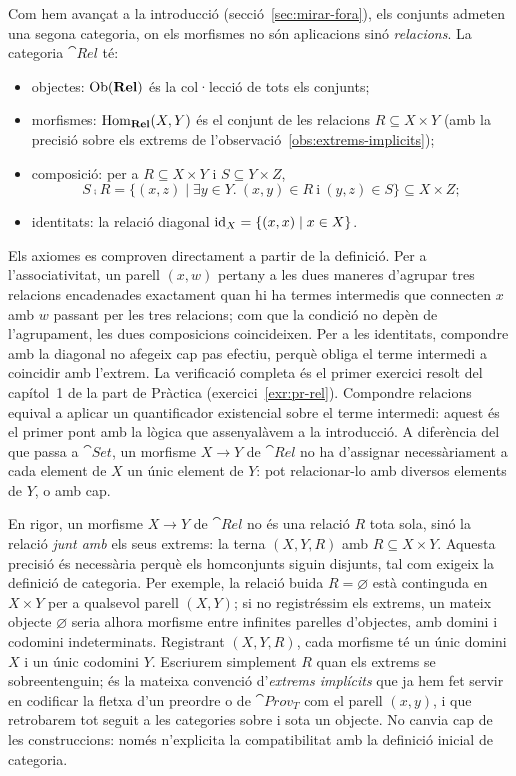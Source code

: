 Com hem avançat a la introducció (secció~\ref{sec:mirar-fora}), els conjunts admeten una segona categoria, on els morfismes no són aplicacions sinó \emph{relacions}. La categoria $\cat{Rel}$ té:
\begin{itemize}
\item objectes: $\operatorname{Ob}(\mathbf{Rel})$ és la col·lecció de tots els conjunts;
\item morfismes: $\operatorname{Hom}_{\mathbf{Rel}}(X,Y)$ és el conjunt de les relacions $R\subseteq X\times Y$ (amb la precisió sobre els extrems de l'observació~\ref{obs:extrems-implicits});
\item composició: per a $R\subseteq X\times Y$ i $S\subseteq Y\times Z$,
\[
S\comp R=\{(x,z)\mid \exists y\in Y.\ (x,y)\in R \ \text{i}\ (y,z)\in S\}\subseteq X\times Z;
\]
\item identitats: la relació diagonal $\operatorname{id}_X=\{(x,x)\mid x\in X\}$.
\end{itemize}
Els axiomes es comproven directament a partir de la definició. Per a l'associativitat, un parell $(x,w)$ pertany a les dues maneres d'agrupar tres relacions encadenades exactament quan hi ha termes intermedis que connecten $x$ amb $w$ passant per les tres relacions; com que la condició no depèn de l'agrupament, les dues composicions coincideixen. Per a les identitats, compondre amb la diagonal no afegeix cap pas efectiu, perquè obliga el terme intermedi a coincidir amb l'extrem. La verificació completa és el primer exercici resolt del capítol~1 de la part de Pràctica (exercici~\ref{exr:pr-rel}). Compondre relacions equival a aplicar un quantificador existencial sobre el terme intermedi: aquest és el primer pont amb la lògica que assenyalàvem a la introducció. A diferència del que passa a $\cat{Set}$, un morfisme $X\to Y$ de $\cat{Rel}$ no ha d'assignar necessàriament a cada element de $X$ un únic element de $Y$: pot relacionar-lo amb diversos elements de $Y$, o amb cap.

\begin{observacio}\label{obs:extrems-implicits}
En rigor, un morfisme $X\to Y$ de $\cat{Rel}$ no és una relació $R$ tota sola, sinó la relació \emph{junt amb} els seus extrems: la terna $(X,Y,R)$ amb $R\subseteq X\times Y$. Aquesta precisió és necessària perquè els homconjunts siguin disjunts, tal com exigeix la definició de categoria. Per exemple, la relació buida $R=\varnothing$ està continguda en $X\times Y$ per a qualsevol parell $(X,Y)$; si no registréssim els extrems, un mateix objecte $\varnothing$ seria alhora morfisme entre infinites parelles d'objectes, amb domini i codomini indeterminats. Registrant $(X,Y,R)$, cada morfisme té un únic domini $X$ i un únic codomini $Y$. Escriurem simplement $R$ quan els extrems se sobreentenguin; és la mateixa convenció d'\emph{extrems implícits} que ja hem fet servir en codificar la fletxa d'un preordre o de $\cat{Prov}_T$ com el parell $(x,y)$, i que retrobarem tot seguit a les categories sobre i sota un objecte. No canvia cap de les construccions: només n'explicita la compatibilitat amb la definició inicial de categoria.
\end{observacio}

